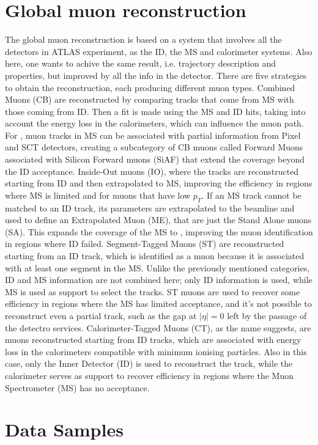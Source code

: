 \documentclass[11pt,a4paper,twoside,openright]{report}
\begin{document}
\section{Global muon reconstruction}
The global muon reconstruction is based on a system that involves all the detectors in ATLAS experiment, as the ID, the MS and calorimeter systems. Also here, one wants to achive the same result, i.e. trajectory description and properties, but improved by all the info in the detector. There are five strategies to obtain the reconstruction, each producing different muon types. Combined Muons (CB) are reconstructed by comparing tracks that come from MS with those coming from ID. Then a fit is made using the MS and ID hits, taking into account the energy loss in the calorimeters, which can influence the muon path. For , muon tracks in MS can be associated with partial information from Pixel and SCT detectors, creating a subcategory of CB muons called Forward Muons associated with Silicon Forward muons (SiAF) that extend the coverage beyond the ID acceptance. Inside-Out muons (IO), where the tracks are reconstructed starting from ID and then extrapolated to MS, improving the efficiency in regions where MS is limited and for muons that have low \( p_T \). If an MS track cannot be matched to an ID track, its parameters are extrapolated to the beamline and used to define an Extrapolated Muon (ME), that are just the Stand Alone muons (SA). This expands the coverage of the MS to , improving the muon identification in regions where ID failed. Segment-Tagged Muons (ST) are reconstructed starting from an ID track, which is identified as a muon because it is associated with at least one segment in the MS. Unlike the previously mentioned categories, ID and MS information are not combined here; only ID information is used, while MS is used as support to select the tracks. ST muons are used to recover some efficiency in regions where the MS has limited acceptance, and it's not possible to reconstruct even a partial track, such as the gap at $|\eta|=0$ left by the passage of the detectro services. Calorimeter-Tagged Muons (CT), as the name suggests, are muons reconstructed starting from ID tracks, which are associated with energy loss in the calorimeters compatible with minimum ionising particles. Also in this case, only the Inner Detector (ID) is used to reconstruct the track, while the calorimeter serves as support to recover efficiency in regions where the Muon Spectrometer (MS) has no acceptance.
\clearpage
\section{Data Samples}
\end{document}
